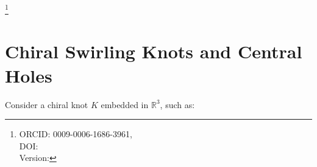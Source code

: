 \documentclass[reprint,aps,onecolumn,nofootinbib]{revtex4-2}
\newcommand{\swirlarrow}{%
    \mathchoice{\mkern-2mu\scriptstyle\boldsymbol{\circlearrowleft}}%
    {\mkern-2mu\scriptstyle\boldsymbol{\circlearrowleft}}%
    {\mkern-2mu\scriptscriptstyle\boldsymbol{\circlearrowleft}}%
    {\mkern-2mu\scriptscriptstyle\boldsymbol{\circlearrowleft}}%
}
\newcommand{\SwirlClock}{S_{(t)}^{\swirlarrow}}
\begin{document}
	\title{\papertitle }
	\author{Omar Iskandarani}
    \thanks{ORCID: 0009-0006-1686-3961,\\
            DOI: \paperdoi \\
            Version: \paperversion
    }
	\date{\today}

\begin{abstract}
We derive long-range gravitational attraction in Swirl--String Theory (SST) as a direct consequence of \emph{chiral swirling knots}---topological vortex filaments such as the trefoil (\(3_1\)), cinquefoil (\(5_1\), (\(5_2\)), and stevedore (\(6_1\)).
Each knot encloses a central rotational line, which acts as an anchor of circulation.
Using Cauchy's integral theorem, we show that the circulation measured around any loop enclosing this axis is quantized by the knot's winding number.
This quantization is expressed by the Swirl Clock \(\SwirlClock\), and its persistence explains why neutral molecules (e.g.\ H\(_2\) attract in otherwise flat space: their knots are connected via the same central swirl line extending beyond the equal-pressure boundary.
\end{abstract}
\maketitle





\section{Chiral Swirling Knots and Central Holes}
    Consider a chiral knot $K$ embedded in $\mathbb{R}^3$, such as:
\end{document}
